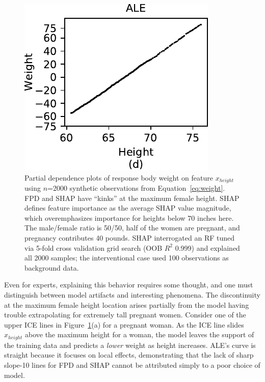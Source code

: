 \documentclass[smallextended]{svjour3}       %
\renewcommand{\eqref}[1]{Equation~\ref{#1}}
\newcommand{\figref}[1]{Figure~\ref{#1}}
\begin{document}
\begin{figure}[!htbp]
\begin{center}
\includegraphics[scale=0.46]{images/height_ale.pdf}\vspace{-2mm}
\caption{\small Partial dependence plots of response body weight on feature $x_{height}$ using $n$=2000 synthetic observations from \eqref{eq:weight}. FPD and SHAP have ``kinks'' at the maximum female height. SHAP defines feature importance as the average SHAP value magnitude, which overemphasizes importance for heights below 70 inches here. The male/female ratio is 50/50, half of the women are pregnant, and pregnancy contributes 40 pounds. SHAP interrogated an RF tuned via 5-fold cross validation grid search (OOB $R^2$ 0.999) and explained all 2000 samples; the interventional case used 100 observations as background data.}
\label{fig:heightweight}
\end{center}
\end{figure}

Even for experts, explaining this behavior requires some thought, and one must distinguish between model artifacts and interesting phenomena. The discontinuity at the maximum female height location arises partially from the model having trouble extrapolating for extremely tall pregnant women. Consider one of the upper ICE lines in \figref{fig:heightweight}(a) for a pregnant woman. As the ICE line slides $x_{height}$ above the maximum height for a woman, the model leaves the support of the training data and predicts a {\em lower} weight as height increases. ALE's curve is straight because it focuses on local effects, demonstrating that the lack of sharp slope-10 lines for FPD and SHAP cannot be attributed simply to a poor choice of model.  
\end{document}
